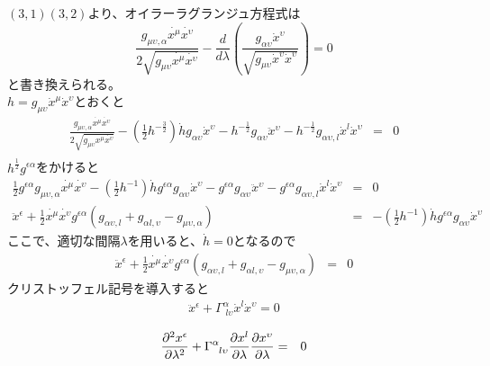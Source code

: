 \documentclass[dvipdfmx]{report} %
\begin{document}
$(3,1)$$(3,2)$より、オイラーラグランジュ方程式は
$$
 \frac{ g_{\mu \upsilon , \alpha} \dot{x^\mu} \dot{x^\upsilon} }{ 2\sqrt{ g_{\mu \upsilon} \dot{x^\mu} \dot{x^\upsilon} } } - \frac{d}{d\lambda} \left( \frac{ g_{\alpha \upsilon}\dot{x}^{\upsilon} }{ \sqrt{g_{\mu \upsilon}\dot{x}^{\upsilon}  \dot{x}^{\upsilon} } } \right) = 0
$$
と書き換えられる。\\
$h = g_{\mu \upsilon}\dot{x}^{\mu}  \dot{x}^{\upsilon}$とおくと
\begin{eqnarray*}
 \frac{ g_{\mu \upsilon , \alpha} \dot{x^\mu} \dot{x^\upsilon} }{ 2\sqrt{ g_{\mu \upsilon} \dot{x^\mu} \dot{x^\upsilon} } } - \left( \frac{1}{2} h^{- \frac{3}{2}} \right) \dot{h} g_{\alpha \upsilon} \dot{x}^{\upsilon} - h^{- \frac{1}{2}} g_{\alpha \upsilon} \ddot{x}^{\upsilon} - h^{- \frac{1}{2}} g_{\alpha \upsilon, l} \dot{x}^l \dot{x}^{\upsilon} &=& 0 \nonumber \\
\end{eqnarray*}
$h^{\frac{1}{2}}g^{\epsilon \alpha}$をかけると
\begin{eqnarray*}
 \frac{1}{2} g^{\epsilon \alpha} g_{\mu \upsilon , \alpha} \dot{x^\mu} \dot{x^\upsilon} - 
\left( \frac{1}{2} h^{-1} \right) \dot{h} g^{\epsilon \alpha} g_{\alpha \upsilon} \dot{x}^{\upsilon} - g^{\epsilon \alpha} g_{\alpha \upsilon} \ddot{x}^{\upsilon} - g^{\epsilon \alpha} g_{\alpha \upsilon, l} \dot{x}^l \dot{x}^{\upsilon} &=& 0 \nonumber \\
\ddot{x}^{\epsilon} + \frac{1}{2} \dot{x^\mu} \dot{x^\upsilon} g^{\epsilon \alpha} \left( g_{\alpha \upsilon, l} + g_{\alpha l, \upsilon} - g_{\mu \upsilon , \alpha} \right) &=&
- \left( \frac{1}{2} h^{-1} \right) \dot{h} g^{\epsilon \alpha} g_{\alpha \upsilon} \dot{x}^{\upsilon}
\end{eqnarray*}
ここで、適切な間隔$\lambda$を用いると、$\dot{h} = 0$となるので
\begin{eqnarray*}
\ddot{x}^{\epsilon} + \frac{1}{2} \dot{x^\mu} \dot{x^\upsilon} g^{\epsilon \alpha} \left( g_{\alpha \upsilon, l} + g_{\alpha l, \upsilon} - g_{\mu \upsilon , \alpha} \right) &=& 0
\end{eqnarray*}
クリストッフェル記号を導入すると
\begin{eqnarray*}
\ddot{x}^{\epsilon} + \Gamma^{\alpha}_{\; l \upsilon} \dot{x}^l \dot{x}^{\upsilon} = 0
\end{eqnarray*}
\begin{tcolorbox}[title=測地線方程式]
\begin{eqnarray*}
\frac{ \partial ^2 {x}^{\epsilon} }{ \partial \lambda^2 } + \tensor{\Gamma}{^{\alpha}_{l \upsilon}} \frac{ \partial x^l }{ \partial \lambda } \frac{ \partial x^{\upsilon} }{ \partial \lambda } &=& 0
\end{eqnarray*}
\end{tcolorbox}
\end{document}
